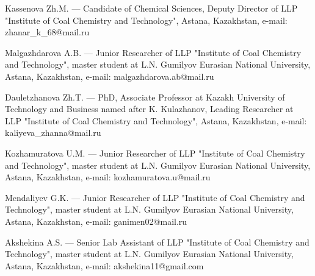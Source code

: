 \begin{authorinfo}
Kassenova Zh.M. — Candidate of Chemical Sciences, Deputy Director of
LLP "Institute of Coal Chemistry and Technology", Astana, Kazakhstan,
e-mail: zhanar\_k\_68@mail.ru

Malgazhdarova A.B. — Junior Researcher of LLP "Institute of Coal
Chemistry and Technology", master student at L.N. Gumilyov Eurasian
National University, Astana, Kazakhstan, e-mail:
malgazhdarova.ab@mail.ru

Dauletzhanova Zh.T. — PhD, Associate Professor at Kazakh University of
Technology and Business named after K. Kulazhanov, Leading Researcher
at LLP "Institute of Coal Chemistry and Technology", Astana,
Kazakhstan, e-mail: kaliyeva\_zhanna@mail.ru

Kozhamuratova U.M. — Junior Researcher of LLP "Institute of Coal
Chemistry and Technology", master student at L.N. Gumilyov Eurasian
National University, Astana, Kazakhstan, e-mail:
kozhamuratova.u@mail.ru

Mendaliyev G.K. — Junior Researcher of LLP "Institute of Coal
Chemistry and Technology", master student at L.N. Gumilyov Eurasian
National University, Astana, Kazakhstan, e-mail: ganimen02@mail.ru

Akshekina A.S. — Senior Lab Assistant of LLP "Institute of Coal
Chemistry and Technology", master student at L.N. Gumilyov Eurasian
National University, Astana, Kazakhstan, e-mail: akshekina11@gmail.com
\end{authorinfo}
